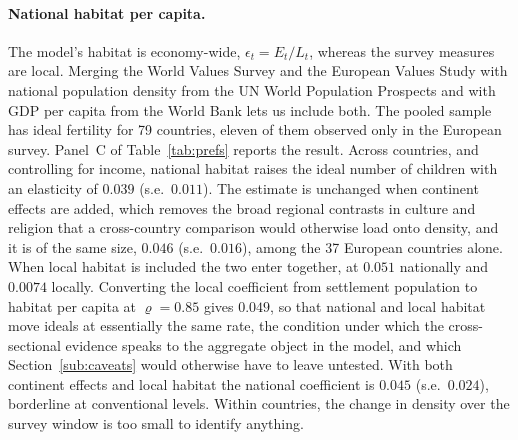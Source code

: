 \documentclass[11pt]{article}
\begin{document}
\paragraph{National habitat per capita.}
The model's habitat is economy-wide, $\epsilon_t=E_t/L_t$, whereas the survey measures are local.
Merging the World Values Survey and the European Values Study with national population density from
the UN World Population Prospects and with GDP per capita from the World Bank lets us include both.
The pooled sample has ideal fertility for 79 countries, eleven of them observed only in the
European survey. Panel~C of Table~\ref{tab:prefs} reports the result. Across countries, and
controlling for income, national habitat raises the ideal number of children with an elasticity of
$0.039$ (s.e.\ $0.011$). The estimate is unchanged when continent effects are added, which removes
the broad regional contrasts in culture and religion that a cross-country comparison would
otherwise load onto density, and it is of the same size, $0.046$ (s.e.\ $0.016$), among the 37
European countries alone. When local habitat is included the two enter together, at $0.051$
nationally and $0.0074$ locally. Converting the local coefficient from settlement population to
habitat per capita at $\varrho=0.85$ gives $0.049$, so that national and local habitat move ideals
at essentially the same rate, the condition under which the cross-sectional evidence speaks to
the aggregate object in the model, and which Section~\ref{sub:caveats} would otherwise have to
leave untested. With both continent effects and local habitat the national coefficient is
$0.045$ (s.e.\ $0.024$), borderline at conventional levels. Within countries, the change in
density over the survey window is too small to identify anything.
\end{document}
